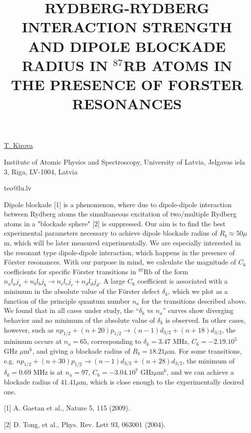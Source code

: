 \title{RYDBERG-RYDBERG INTERACTION STRENGTH AND DIPOLE BLOCKADE RADIUS IN $^{87}$RB ATOMS IN THE PRESENCE OF FORSTER RESONANCES}

\underline{T. Kirova}  

{\normalsize{\vspace{-4mm}
Institute of Atomic Physics and Spectroscopy,
University of Latvia,
Jelgavas iela 3,
Riga, LV-1004,
Latvia



\email teo@lu.lv}}

Dipole blockade [1] is a phenomenon, where due to dipole-dipole interaction between Rydberg atoms the simultaneous excitation of two/multiple Rydberg atoms in a "blockade sphere" [2] is suppressed. Our aim is to find the best experimental parameters necessary to achieve dipole blockade radius of $R_b\approx50\mu$m, which will be later measured experimentally. We are especially interested in the resonant type dipole-dipole interaction, which happens in the presence of  F\"orster resonances.
With our purpose in mind, we calculate the magnitude of $C_6$ coefficients for specific F\"orster transitions in $^{87}$Rb of the form $n_{a}l_{a}j_{a}+n_{b}l_{b}j_{b}\rightarrow n_{c}l_{c}j_{c}+n_{d}l_{d}j_{d}$.
A large $C_6$ coefficient is associated with a minimum in the absolute value of the F\"orster defect $\delta_k$, which we plot as a function of the principle quantum number $n_{a}$ for the transitions described above.
We found that in all cases under study, the  ``$\delta_k$ vs $n_{a}$'' curves show diverging behavior and no minimum of the absolute value of $\delta_k$ is observed.
In other cases, however, such as $np_{1/2}+(n+20)p_{1/2}\rightarrow(n-1)d_{3/2}+(n+18)d_{3/2}$, the minimum occurs at $n_{a}=65$, corresponding to $\delta_{k}=3.47$ MHz, $C_6=-2.19.10^{5}$
GHz $\mu$m$^6$, and giving a blockade radius of  $R_b=18.21\mu$m.
For some transitions, e.g. $np_{1/2}+(n+30)p_{1/2}\rightarrow(n-1)d_{3/2}+(n+28)d_{3/2}$, the minimum of $\delta_{k}=0.69$ MHz is at $n_{a}=97$, $C_6=-3.04.10^{7}$ GHz$\mu$m$^6$, and we can achieve a  blockade radius of  $41.41\mu$m, which is close enough to the experimentally desired one.

{\normalsize
[1] A. Gaetan et al., Nature 5, 115 (2009).
\vsp

[2] D. Tong, et al., Phys. Rev. Lett 93, 063001 (2004).
}


\vspace{\baselineskip}